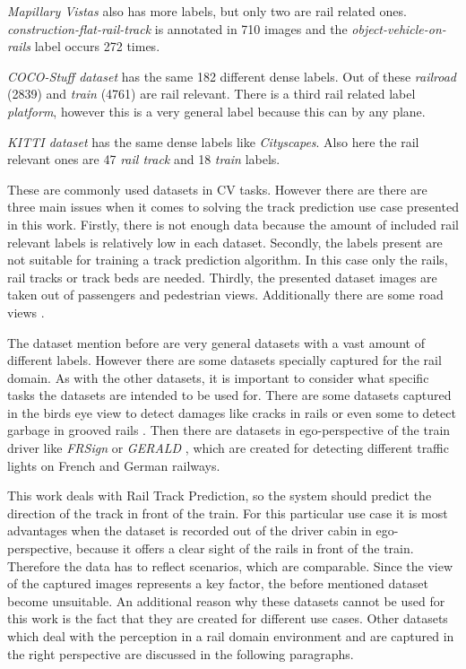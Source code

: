 \textit{Mapillary Vistas} \cite{mapillaryVistas2017} also has more labels, but only two are rail related ones. \textit{construction-flat-rail-track} is annotated in 710 images and the \textit{object-vehicle-on-rails} label occurs 272 times.

\textit{COCO-Stuff dataset} \cite{COCO-StuffDataset} has the same 182 different dense labels. Out of these \textit{railroad} (2839) and \textit{train} (4761) are rail relevant. There is a third rail related label \textit{platform}, however this is a very general label because this can by any plane.

\textit{KITTI dataset} \cite{kittiDataset2018} has the same dense labels like \textit{Cityscapes}. Also here the rail relevant ones are 47 \textit{rail track} and 18 \textit{train} labels.

These are commonly used datasets in \ac{CV} tasks. However there are there are three main issues when it comes to solving the track prediction use case presented in this work. Firstly, there is not enough data because the amount of included rail relevant labels is relatively low in each dataset. Secondly, the labels present are not suitable for training a track prediction algorithm. In this case only the rails, rail tracks or track beds are needed. Thirdly, the presented dataset images are taken out of passengers and pedestrian views. Additionally there are some road views \cite{Hadded.2022}.

The dataset mention before are very general datasets with a vast amount of different labels. However there are some datasets specially captured for the rail domain.
As with the other datasets, it is important to consider what specific tasks the datasets are intended to be used for. There are some datasets captured in the birds eye view to detect damages like cracks in rails \cite{rail5k2021} \cite{ma2024cross} or even some to detect garbage in grooved rails \cite{Huang_2021}. Then there are datasets in ego-perspective of the train driver like \textit{FRSign} \cite{Harb2020FRSignAL} or \textit{GERALD} \cite{leibner2023gerald}, which are created for detecting different traffic lights on French and German railways.

This work deals with Rail Track Prediction, so the system should predict the direction of the track in front of the train. For this particular use case it is most advantages when the dataset is recorded out of the driver cabin in ego-perspective, because it offers a clear sight of the rails in front of the train. Therefore the data has to reflect scenarios, which are comparable. Since the view of the captured images represents a key factor, the before mentioned dataset become unsuitable. An additional reason why these datasets cannot be used for this work is the fact that they are created for different use cases.
Other datasets which deal with the perception in a rail domain environment and are captured in the right perspective are discussed in the following paragraphs.

